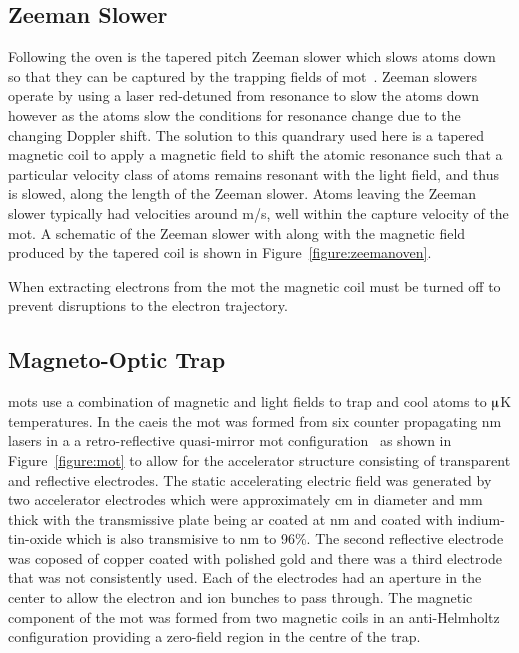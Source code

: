 \subsection{Zeeman Slower}
Following the oven is the tapered pitch Zeeman slower which slows atoms down so that they can be captured by the trapping fields of \gls{mot}~\cite{bell_slow_2010}.
Zeeman slowers operate by using a laser red-detuned from resonance to slow the atoms down however as the atoms slow the conditions for resonance change due to the changing Doppler shift.
The solution to this quandrary used here is a tapered magnetic coil to apply a magnetic field to shift the atomic resonance such that a particular velocity class of atoms remains resonant with the light field, and thus is slowed, along the length of the Zeeman slower.
Atoms leaving the Zeeman slower typically had velocities around \unit[35]{m/s}, well within the capture velocity of the \gls{mot}.
A schematic of the Zeeman slower with along with the magnetic field produced by the tapered coil is shown in Figure~\ref{figure:zeemanoven}.

When extracting electrons from the \gls{mot} the magnetic coil must be turned off to prevent disruptions to the electron trajectory.

\subsection{Magneto-Optic Trap}
\Glspl{mot} use a combination of magnetic and light fields to trap and cool atoms to $\muup$K temperatures.
In the \gls{caeis} the \gls{mot} was formed from six counter propagating \unit[780]{nm} lasers in a a retro-reflective quasi-mirror \gls{mot} configuration~\cite{hanssen_using_2006,mcculloch_generation_2013} as shown in Figure~\ref{figure:mot} to allow for the accelerator structure consisting of transparent and reflective electrodes.
The static accelerating electric field was generated by two accelerator electrodes which were approximately \unit[11]{cm} in diameter and \unit[4]{mm} thick with the transmissive plate being \gls{ar} coated at \unit[780]{nm} and coated with indium-tin-oxide which is also transmisive to \unit[780]{nm} to 96\%.
The second reflective electrode was coposed of copper coated with polished gold and there was a third electrode that was not consistently used.
Each of the electrodes had an aperture in the center to allow the electron and ion bunches to pass through.
The magnetic component of the \gls{mot} was formed from two magnetic coils in an anti-Helmholtz configuration providing a zero-field region in the centre of the trap.

